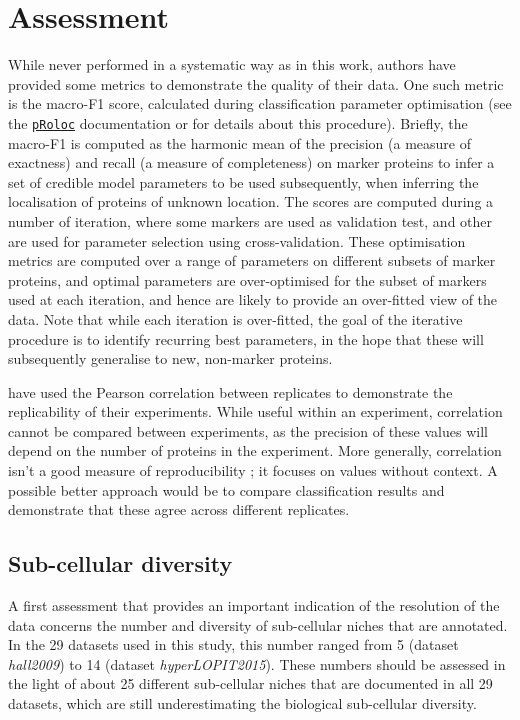\documentclass[12pt]{article}\usepackage[]{graphicx}\usepackage[]{color}
\newcommand{\Rpackage}[1]{\texttt{#1}}
\newcommand\Biocpkg[1]{%
  {\href{http://bioconductor.org/packages/#1}%
    {\Rpackage{#1}}}}
\begin{document}
\section{Assessment}


While never performed in a systematic way as in this work, authors
have provided some metrics to demonstrate the quality of their
data. One such metric is the macro-F1 score, calculated during
classification parameter optimisation (see the \Biocpkg{pRoloc}
\cite{Gatto:2014a} documentation or \cite{Gatto:2014} for details
about this procedure). Briefly, the macro-F1 is computed as the
harmonic mean of the precision (a measure of exactness) and recall (a
measure of completeness) on marker proteins to infer a set of credible
model parameters to be used subsequently, when inferring the
localisation of proteins of unknown location. The scores are computed
during a number of iteration, where some markers are used as
validation test, and other are used for parameter selection using
cross-validation. These optimisation metrics are computed over a range
of parameters on different subsets of marker proteins, and optimal
parameters are over-optimised for the subset of markers used at each
iteration, and hence are likely to provide an over-fitted view of the
data. Note that while each iteration is over-fitted, the goal of the
iterative procedure is to identify recurring best parameters, in the
hope that these will subsequently generalise to new, non-marker
proteins.

\citet{Itzhak:2016} have used the Pearson correlation between
replicates to demonstrate the replicability of their
experiments. While useful within an experiment, correlation cannot be
compared between experiments, as the precision of these values will
depend on the number of proteins in the experiment. More generally,
correlation isn't a good measure of reproducibility
\cite{Irizarry:2015}; it focuses on values without context. A possible
better approach would be to compare classification results and
demonstrate that these agree across different replicates.


\subsection{Sub-cellular diversity}\label{sec:sub-cell-divers}

A first assessment that provides an important indication of the
resolution of the data concerns the number and diversity of
sub-cellular niches that are annotated. In the 29
datasets used in this study, this number ranged from
5 (dataset
\textit{hall2009}) to
14 (dataset
\textit{hyperLOPIT2015}). These numbers should be
assessed in the light of about 25 different sub-cellular niches that
are documented in all 29 datasets, which are still
underestimating the biological sub-cellular diversity.
\end{document}
